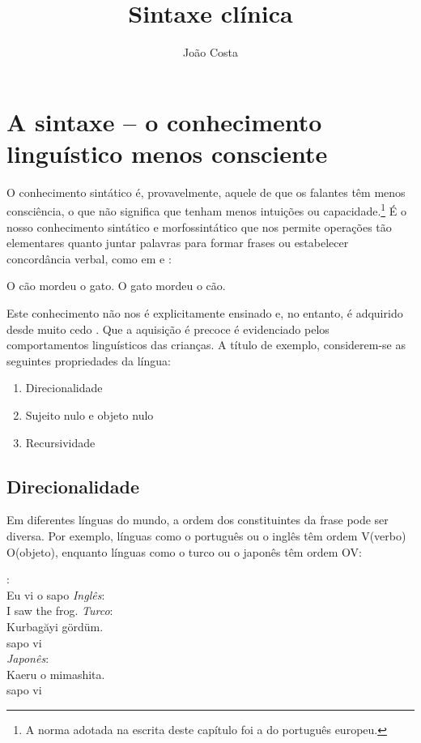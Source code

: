 \documentclass[output=paper,colorlinks,citecolor=brown,booklanguage=portuguese]{langscibook}
\title{Sintaxe clínica}
\author{João Costa\affiliation{Universidade Nova de Lisboa, Faculdade de Ciências Sociais e Humanas}}
\begin{document}
\maketitle

\section{A sintaxe -- o conhecimento linguístico menos consciente}
O conhecimento sintático é, provavelmente, aquele de que os falantes têm menos consciência, o que não significa que tenham menos intuições ou capacidade.\footnote{A norma adotada na escrita deste capítulo foi a do português europeu.}
É o nosso conhecimento sintático e morfossintático que nos permite operações tão elementares quanto juntar palavras para formar frases ou estabelecer concordância verbal, como em  e :

\ea\label{ex:cap2ex1}
    \ea O cão mordeu o gato.
    \ex O gato mordeu o cão.
    \z
\z
\newpage
\ea\label{ex:cap2ex2}
    \z
\z

Este conhecimento não nos é explicitamente ensinado e, no entanto, é adquirido desde muito cedo \citep{Guasti2002}. Que a aquisição é precoce é evidenciado pelos comportamentos linguísticos das crianças. A título de exemplo, considerem-se as seguintes propriedades da língua:
\begin{enumerate}
  \item[] Direcionalidade
  \item[] Sujeito nulo e objeto nulo
  \item[] Recursividade
\end{enumerate}


\subsection{Direcionalidade}

Em diferentes línguas do mundo, a ordem dos constituintes da frase pode ser diversa. Por exemplo, línguas como o português ou o inglês têm ordem V(verbo) O(objeto), enquanto línguas como o turco ou o japonês têm ordem OV:

\ea\label{ex:cap2ex3}
    :\\
        Eu vi o sapo
    \ex \emph{Inglês}:\\
    I saw the frog.
    \ex \emph{Turco}:\\
    \gll Kurbagăyi gördüm.\\
    sapo     vi\\
    \ex \emph{Japonês}:\\
    \gll Kaeru o mimashita.\\
    sapo  {} vi\\
    \z
\z
\end{document}
